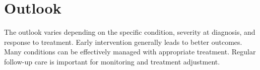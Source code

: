 \section{Outlook}
The outlook varies depending on the specific condition, severity at diagnosis, and response to treatment. Early intervention generally leads to better outcomes. Many conditions can be effectively managed with appropriate treatment. Regular follow-up care is important for monitoring and treatment adjustment.

